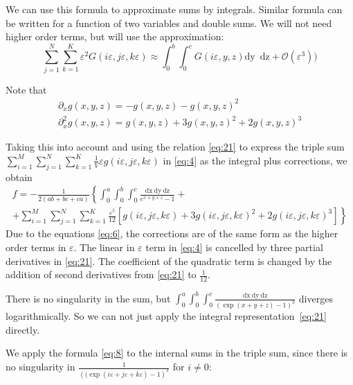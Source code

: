 \documentclass{article}
\newcommand{\dx}{\mathrm{dx}~}
\newcommand{\dy}{\mathrm{dy}~}
\newcommand{\dz}{\mathrm{dz}}
\begin{document}
We can use this formula to approximate sums by integrals. Similar formula can be written for a
function of two variables and double sums. We will not need higher order terms, but will use the
approximation:
\begin{equation}
\label{eq:8}
  \sum_{j=1}^{N}\sum_{k=1}^{K}\varepsilon^{2}G\left(i\varepsilon,j\varepsilon,k\varepsilon\right)\approx \int_{0}^{b}\int_{0}^{c}G(i\varepsilon,y,z) \dy\; \dz+\mathcal{O}(\varepsilon^{3}))
\end{equation}



Note that
\begin{equation}
  \label{eq:6}
  \begin{array}{c}
    \partial_{x}g(x,y,z)=-g(x,y,z)-g(x,y,z)^{2}\\
    \partial_{x}^{2}g(x,y,z)=g(x,y,z)+3g(x,y,z)^{2}+2g(x,y,z)^{3}
  \end{array}
\end{equation}

Taking this into account and using the relation \eqref{eq:21} to express the triple sum
$ \sum_{i=1}^{M} \sum_{j=1}^{N} \sum_{k=1}^{K} \frac{1}{V}    \varepsilon g(i\varepsilon,j\varepsilon,k\varepsilon)$
in \eqref{eq:4} as the integral plus corrections, we obtain
\begin{multline}
\label{eq:23}
 f=-\frac{1}{2(ab+bc+ca)}\left\{\int_{0}^{a} \int_{0}^{b}\int_{0}^{c}\frac{\dx \dy \dz}{e^{x+y+z}-1}+\right.\\
  \left.+\sum_{i=1}^{M}\sum_{j=1}^{N}\sum_{k=1}^{K}\frac{\varepsilon^{5}}{12}\left[g(i\varepsilon,j\varepsilon,k\varepsilon)+3
      g(i\varepsilon,j\varepsilon,k\varepsilon)^{2}+2
      g(i\varepsilon,j\varepsilon,k\varepsilon)^{3}\right]\right\}
\end{multline}
Due to the equations \eqref{eq:6}, the corrections are of the same form as the higher order terms in
$\varepsilon$. The linear in $\varepsilon$ term in \eqref{eq:4} is cancelled by three partial
derivatives in \eqref{eq:21}. The coefficient of the quadratic term is changed by the addition of
second derivatives from \eqref{eq:21} to $\frac{1}{12}$.


There is no singularity in the sum, but
$\int_{0}^{a} \int_{0}^{b}\int_{0}^{c}\frac{\dx \dy \dz}{(\exp(x+y+z)-1)^{3}}$ diverges
logarithmically. So we can not just apply the integral representation~\eqref{eq:21} directly.

We apply the formula \eqref{eq:8} to the internal sums in the triple sum, since there is no
singularity in $\frac{1}{\left((\exp(i\varepsilon+j\varepsilon+k\varepsilon)-1\right)^{3}}$ for
$i\neq 0$:
\end{document}
